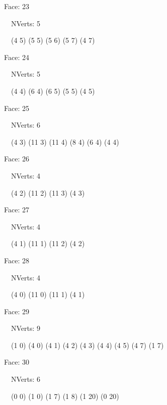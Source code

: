 \documentclass{article}
\begin{document}
{\footnotesize 

Face: 23

\   \    NVerts: 5

 \   \   (4 5) (5 5) (5 6) (5 7) (4 7)}

{\footnotesize 

Face: 24

\   \    NVerts: 5

 \   \   (4 4) (6 4) (6 5) (5 5) (4 5)}

{\footnotesize 

Face: 25

\   \    NVerts: 6

 \   \   (4 3) (11 3) (11 4) (8 4) (6 4) (4 4)}

{\footnotesize 

Face: 26

\   \    NVerts: 4

 \   \   (4 2) (11 2) (11 3) (4 3)}

{\footnotesize 

Face: 27

\   \    NVerts: 4

 \   \   (4 1) (11 1) (11 2) (4 2)}

{\footnotesize 

Face: 28

\   \    NVerts: 4

 \   \   (4 0) (11 0) (11 1) (4 1)}

{\footnotesize 

Face: 29

\   \    NVerts: 9

 \   \   (1 0) (4 0) (4 1) (4 2) (4 3) (4 4) (4 5) (4 7) (1 7)}

{\footnotesize 

Face: 30

\   \    NVerts: 6

 \   \   (0 0) (1 0) (1 7) (1 8) (1 20) (0 20)}


 \newpage
\end{document}
